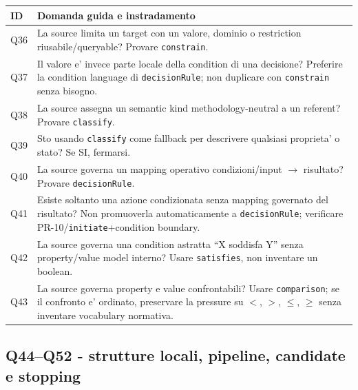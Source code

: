 \documentclass[11pt,a4paper]{article}
\begin{document}
\begin{longtable}{L{17mm}L{122mm}}
\toprule
\textbf{ID} & \textbf{Domanda guida e instradamento} \\
\midrule\endhead
Q36 & La source limita un target con un valore, dominio o restriction riusabile/queryable? Provare \texttt{constrain}. \\
Q37 & Il valore e' invece parte locale della condition di una decisione? Preferire la condition language di \texttt{decisionRule}; non duplicare con \texttt{constrain} senza bisogno. \\
Q38 & La source assegna un semantic kind methodology-neutral a un referent? Provare \texttt{classify}. \\
Q39 & Sto usando \texttt{classify} come fallback per descrivere qualsiasi proprieta' o stato? Se SI, fermarsi. \\
Q40 & La source governa un mapping operativo condizioni/input $\rightarrow$ risultato? Provare \texttt{decisionRule}. \\
Q41 & Esiste soltanto una azione condizionata senza mapping governato del risultato? Non promuoverla automaticamente a \texttt{decisionRule}; verificare PR-10/\texttt{initiate}+condition boundary. \\
Q42 & La source governa una condition astratta ``X soddisfa Y'' senza property/value model interno? Usare \texttt{satisfies}, non inventare un boolean. \\
Q43 & La source governa property e value confrontabili? Usare \texttt{comparison}; se il confronto e' ordinato, preservare la pressure su $<$, $>$, $\leq$, $\geq$ senza inventare vocabulary normativa. \\
\bottomrule
\end{longtable}

\subsection{Q44--Q52 - strutture locali, pipeline, candidate e stopping}
\end{document}

